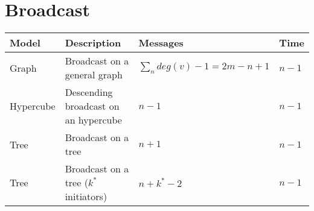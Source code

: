 \section{Broadcast}
\begin{table}[h]
\begin{tabular}{llll}
			\textbf{Model}		& \textbf{Description}						& \textbf{Messages}						& \textbf{Time} \\
	\hline 	Graph 				& Broadcast on a general graph				& $\sum_{n}{deg(v) - 1} = 2m - n + 1$	& $n - 1$ \\
	\hline 	Hypercube 			& Descending broadcast on an hypercube		& $n - 1$								& $n - 1$ \\
	\hline 	Tree 				& Broadcast on a tree						& $n + 1$								& $n - 1$ \\
	\hline 	Tree 				& Broadcast on a tree ($k^*$ initiators)	& $n + k^* - 2$							& $n - 1$ \\
\end{tabular}
\end{table}